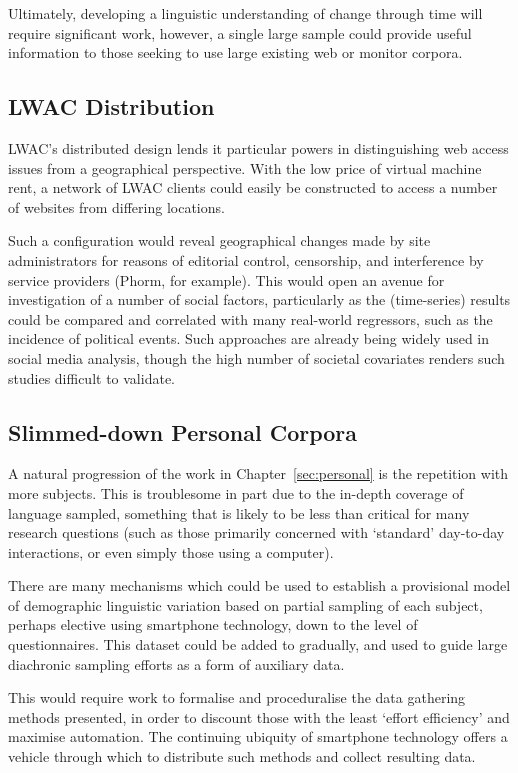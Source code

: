 Ultimately, developing a linguistic understanding of change through time will require significant work, however, a single large sample could provide useful information to those seeking to use large existing web or monitor corpora.

\subsection{LWAC Distribution}
LWAC's distributed design lends it particular powers in distinguishing web access issues from a geographical perspective.  With the low price of virtual machine rent, a network of LWAC clients could easily be constructed to access a number of websites from differing locations.

Such a configuration would reveal geographical changes made by site administrators for reasons of editorial control, censorship, and interference by service providers (Phorm\cite{clayton2008phorm}, for example).  This would open an avenue for investigation of a number of social factors, particularly as the (time-series) results could be compared and correlated with many real-world regressors, such as the incidence of political events.  Such approaches are already being widely used in social media analysis\cite{achrekar2011predicting,bollen2011twitter}, though the high number of societal covariates renders such studies difficult to validate.

\subsection{Slimmed-down Personal Corpora}
A natural progression of the work in Chapter~\ref{sec:personal} is the repetition with more subjects.  This is troublesome in part due to the in-depth coverage of language sampled, something that is likely to be less than critical for many research questions (such as those primarily concerned with `standard' day-to-day interactions, or even simply those using a computer).

There are many mechanisms which could be used to establish a provisional model of demographic linguistic variation based on partial sampling of each subject, perhaps elective using smartphone technology, down to the level of questionnaires.  This dataset could be added to gradually, and used to guide large diachronic sampling efforts as a form of auxiliary data.

This would require work to formalise and proceduralise the data gathering methods presented, in order to discount those with the least `effort efficiency' and maximise automation.  The continuing ubiquity of smartphone technology offers a vehicle through which to distribute such methods and collect resulting data.

